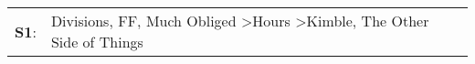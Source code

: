 \begin{supertabular}{p{0.03\textwidth}p{0.92\textwidth}}
 \textbf{S1}:  &  Divisions\textsuperscript{}, \enspace FF\textsuperscript{}, \enspace Much Obliged\textsuperscript{} \textgreater \enspace Hours\textsuperscript{} \textgreater \enspace Kimble\textsuperscript{}, \enspace The Other Side of Things\textsuperscript{}  \enspace  \\
\end{supertabular}

